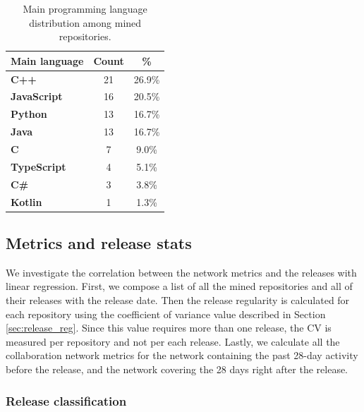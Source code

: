 \begin{table}
    \centering
    \begin{tabular}{| l | c | c |}
        \hline
        \textbf{Main language} & \textbf{Count} & \textbf{\%} \\
        \hline
        \textbf{C++} & 21 & 26.9\% \\
        \textbf{JavaScript} & 16 & 20.5\% \\
        \textbf{Python} & 13 & 16.7\% \\
        \textbf{Java} & 13 & 16.7\% \\
        \textbf{C} & 7 & 9.0\% \\
        \textbf{TypeScript} & 4 & 5.1\% \\
        \textbf{C\#} & 3 & 3.8\% \\
        \textbf{Kotlin} & 1 & 1.3\% \\        
        \hline
    \end{tabular}
    \caption{Main programming language distribution among mined repositories.}
    \label{tab:repo_lang}
\end{table}

\subsection{Metrics and release stats}

We investigate the correlation between the network metrics and the releases with linear regression. First, we compose a list of all the mined repositories and all of their releases with the release date. Then the release regularity is calculated for each repository using the coefficient of variance value described in Section \ref{sec:release_reg}. Since this value requires more than one release, the CV is measured per repository and not per each release. Lastly, we calculate all the collaboration network metrics for the network containing the past 28-day activity before the release, and the network covering the 28 days right after the release.

\subsubsection{Release classification}


